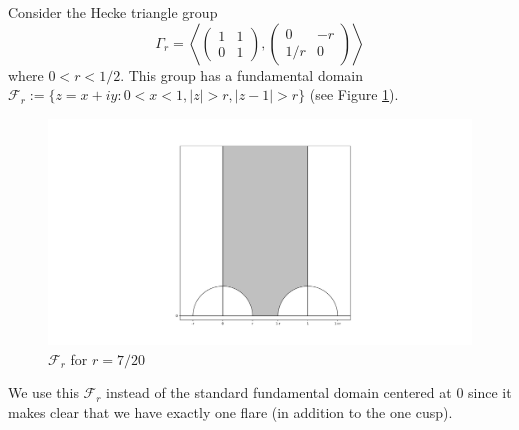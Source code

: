\documentclass[]{article}
\begin{document}
Consider the Hecke triangle group
$$
\Gamma_r = \left\langle
	\begin{pmatrix}
		1 & 1 \\
		0 & 1
	\end{pmatrix},
	\begin{pmatrix}
		0 & -r \\
		1/r & 0
	\end{pmatrix}
	\right\rangle
$$
where $0 < r < 1/2$.
This group has a fundamental domain $\mathcal{F}_r := \{ z = x + iy : 0 < x < 1, |z| > r, |z - 1| > r \}$ (see Figure \ref{Fr}).
\begin{figure}[h]
	\centering
	\includegraphics[trim=400 60 380 80, clip, width=0.6\linewidth]{gamma_r_fundl.pdf}
	\caption{$\mathcal{F}_r$ for $r = 7/20$}
	\label{Fr}
\end{figure}
We use this $\mathcal{F}_r$ instead of the standard fundamental domain centered at $0$ since it makes clear that we have exactly one flare (in addition to the one cusp).
\end{document}
